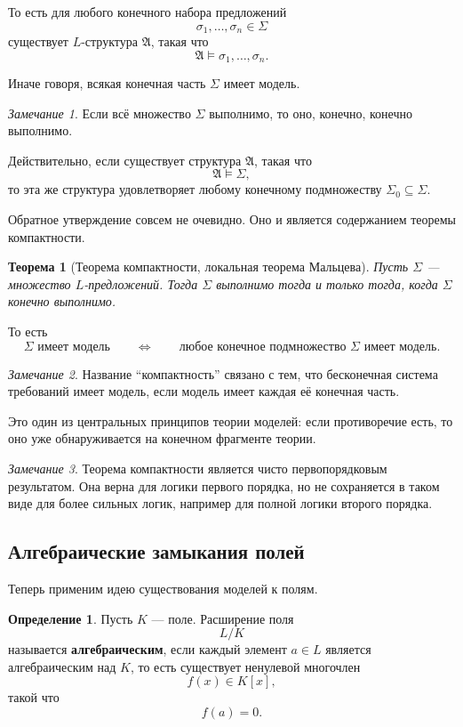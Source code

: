 \documentclass[12pt,a4paper,oneside,openany]{book}
\theoremstyle{definition}
\newtheorem{definition}{Определение}[chapter]
\theoremstyle{plain}
\newtheorem{theorem}{Теорема}[chapter]
\theoremstyle{remark}
\newtheorem{remark}{Замечание}[chapter]
\begin{document}
То есть для любого конечного набора предложений
\[
\sigma_1,\ldots,\sigma_n\in\Sigma
\]
существует $L$-структура $\mathfrak A$, такая что
\[
\mathfrak A\models\sigma_1,\ldots,\sigma_n.
\]

Иначе говоря, всякая конечная часть $\Sigma$ имеет модель.

\begin{remark}
Если всё множество $\Sigma$ выполнимо, то оно, конечно, конечно выполнимо.

Действительно, если существует структура $\mathfrak A$, такая что
\[
\mathfrak A\models\Sigma,
\]
то эта же структура удовлетворяет любому конечному подмножеству $\Sigma_0\subseteq\Sigma$.
\end{remark}

Обратное утверждение совсем не очевидно. Оно и является содержанием теоремы компактности.

\begin{theorem}[Теорема компактности, локальная теорема Мальцева]
Пусть $\Sigma$ — множество $L$-предложений. Тогда $\Sigma$ выполнимо тогда и только тогда, когда $\Sigma$ конечно выполнимо.
\end{theorem}

То есть
\[
\Sigma\text{ имеет модель}
\qquad
\Longleftrightarrow
\qquad
\text{любое конечное подмножество }\Sigma\text{ имеет модель}.
\]

\begin{remark}
Название ``компактность'' связано с тем, что бесконечная система требований имеет модель, если модель имеет каждая её конечная часть.

Это один из центральных принципов теории моделей: если противоречие есть, то оно уже обнаруживается на конечном фрагменте теории.
\end{remark}

\begin{remark}
Теорема компактности является чисто первопорядковым результатом. Она верна для логики первого порядка, но не сохраняется в таком виде для более сильных логик, например для полной логики второго порядка.
\end{remark}

\subsection{Алгебраические замыкания полей}

Теперь применим идею существования моделей к полям.

\begin{definition}
Пусть $K$ — поле. Расширение поля
\[
L/K
\]
называется \textbf{алгебраическим}, если каждый элемент $a\in L$ является алгебраическим над $K$, то есть существует ненулевой многочлен
\[
f(x)\in K[x],
\]
такой что
\[
f(a)=0.
\]
\end{definition}
\end{document}
